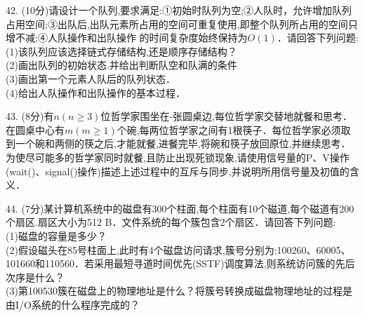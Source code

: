 42. (10分)请设计一个队列,要求满足:①初始时队列为空;②人队时，允许增加队列占用空间;③出队后,出队元素所占用的空间可重复使用,即整个队列所占用的空间只增不减;④人队操作和出队操作
的时间复杂度始终保持为$O(1)$．请回答下列问题: \\
(1)该队列应该选择链式存储结构,还是顺序存储结构？ \\
(2)画出队列的初始状态.并给出判断队空和队满的条件 \\
(3)画出第一个元素人队后的队列状态． \\
(4)给出人队操作和出队操作的基本过程．

43. (8分)有$n(n\geqslant3)$位哲学家围坐在-张圆桌边,每位哲学家交替地就餐和思考．在圆桌中心有$m(m\geqslant1)$个碗,每两位哲学家之间有1根筷子．每位哲学家必须取到一个碗和两侧的筷之后,才能就餐,进餐完毕,将碗和筷子放回原位,并继续思考．为使尽可能多的哲学家同时就餐,且防止出现死锁现象,请使用信号量的P、V操作(wait()、signal()操作)描述上述过程中的互斥与同步,并说明所用信号量及初值的含义．

44. (7分)某计算机系统中的磁盘有300个柱面,每个柱面有10个磁道,每个磁道有200个扇区.扇区大小为512 B．文件系统的每个簇包含2个扇区．请回答下列问题: \\
(1)磁盘的容量是多少？ \\
(2)假设磁头在85号柱面上,此时有4个磁盘访问请求,簇号分别为:100260、60005、101660和110560．若采用最短寻道时间优先(SSTF)调度算法,则系统访问簇的先后次序是什么？ \\
(3)第100530簇在磁盘上的物理地址是什么？将簇号转换成磁盘物理地址的过程是由I/O系统的什么程序完成的？

